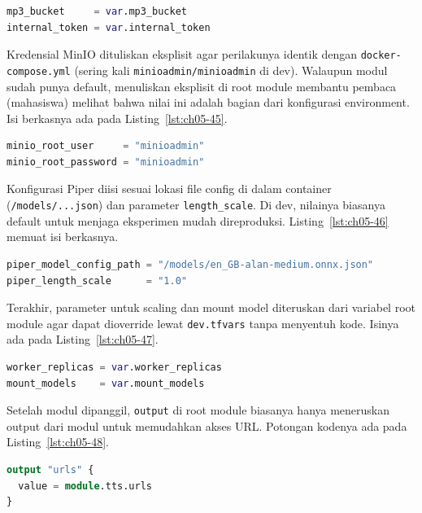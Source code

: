 \begin{lstlisting}[language=terraform, caption={Potongan main.tf: bucket dan token dari variabel}, label={lst:ch05-44}]
mp3_bucket     = var.mp3_bucket
internal_token = var.internal_token
\end{lstlisting}

Kredensial MinIO dituliskan eksplisit agar perilakunya identik dengan \texttt{docker-compose.yml} (sering kali \texttt{minioadmin/minioadmin} di dev). Walaupun modul sudah punya default, menuliskan eksplisit di root module membantu pembaca (mahasiswa) melihat bahwa nilai ini adalah bagian dari konfigurasi environment. Isi berkasnya ada pada Listing~\ref{lst:ch05-45}.

\begin{lstlisting}[language=terraform, caption={Potongan main.tf: login MinIO}, label={lst:ch05-45}]
minio_root_user     = "minioadmin"
minio_root_password = "minioadmin"
\end{lstlisting}

Konfigurasi Piper diisi sesuai lokasi file config di dalam container (\texttt{/models/...json}) dan parameter \texttt{length\_scale}. Di dev, nilainya biasanya default untuk menjaga eksperimen mudah direproduksi. Listing~\ref{lst:ch05-46} memuat isi berkasnya.

\begin{lstlisting}[language=terraform, caption={Potongan main.tf: konfigurasi Piper}, label={lst:ch05-46}]
piper_model_config_path = "/models/en_GB-alan-medium.onnx.json"
piper_length_scale      = "1.0"
\end{lstlisting}

Terakhir, parameter untuk scaling dan mount model diteruskan dari variabel root module agar dapat dioverride lewat \texttt{dev.tfvars} tanpa menyentuh kode. Isinya ada pada Listing~\ref{lst:ch05-47}.

\begin{lstlisting}[language=terraform, caption={Potongan main.tf: jumlah worker dan mount model}, label={lst:ch05-47}]
worker_replicas = var.worker_replicas
mount_models    = var.mount_models
\end{lstlisting}

Setelah modul dipanggil, \texttt{output} di root module biasanya hanya meneruskan output dari modul untuk memudahkan akses URL. Potongan kodenya ada pada Listing~\ref{lst:ch05-48}.

\begin{lstlisting}[language=terraform, caption={Potongan kode Terraform pada main.tf (9)}, label={lst:ch05-48}]
output "urls" {
  value = module.tts.urls
}
\end{lstlisting}

